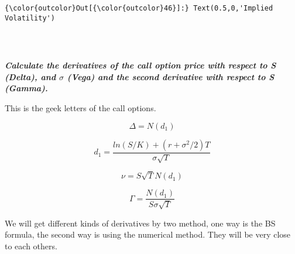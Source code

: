 \documentclass[11pt]{article}
\begin{document}
\begin{Verbatim}[commandchars=\\\{\}]
{\color{outcolor}Out[{\color{outcolor}46}]:} Text(0.5,0,'Implied Volatility')
\end{Verbatim}
            
    \begin{center}
    \end{center}
    { \hspace*{\fill} \\}
    
    \subsection{}\label{section}

\textbf{\emph{Calculate the derivatives of the call option price with
respect to S (Delta), and \(\sigma\) (Vega) and the second derivative
with respect to S (Gamma).}}

This is the geek letters of the call options.

\[\Delta=N(d_1)\]

\[d_1=\frac{ln(S/K)+(r+\sigma^2/2)T}{\sigma\sqrt{T}}\]

\[\nu=S\sqrt{T}N(d_1)\]

\[\Gamma=\frac{N(d_1)}{S\sigma\sqrt{T}}\]

We will get different kinds of derivatives by two method, one way is the
BS formula, the second way is using the numerical method. They will be
very close to each others.
\end{document}
